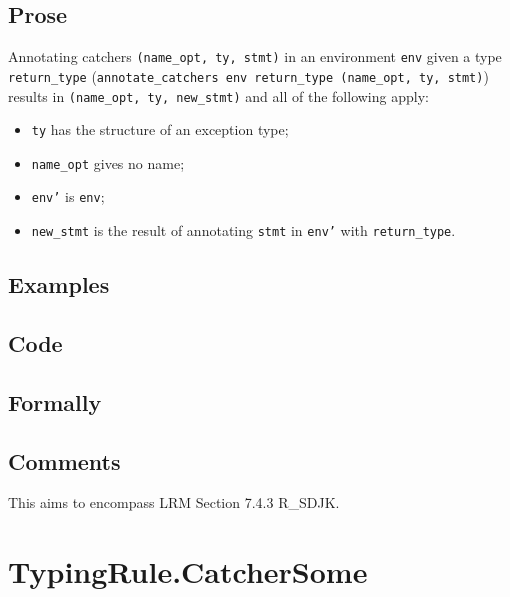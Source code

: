 \documentclass{book}
\begin{document}
  \subsection{Prose}
   Annotating catchers \texttt{(name\_opt, ty, stmt)} in an environment
\texttt{env} given a type \texttt{return\_type} (\texttt{annotate\_catchers env
return\_type (name\_opt, ty, stmt)}) results in \texttt{(name\_opt, ty,
new\_stmt)} and all of the following apply:
   \begin{itemize}
   \item \texttt{ty} has the structure of an exception type;
   \item \texttt{name\_opt} gives no name;
   \item \texttt{env'} is \texttt{env};
   \item \texttt{new\_stmt} is the result of annotating \texttt{stmt} in \texttt{env'} with \texttt{return\_type}.
   \end{itemize}

  \subsection{Examples}

  \subsection{Code}

  \subsection{Formally}

  \subsection{Comments}
    This aims to encompass LRM Section 7.4.3 R\_SDJK.

\section{TypingRule.CatcherSome \label{sec:TypingRule.CatcherSome}}
\end{document}
